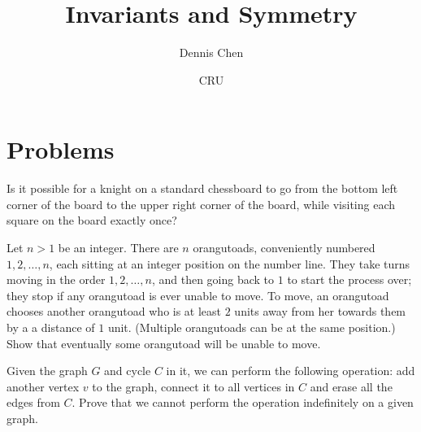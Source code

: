 \documentclass[mast]{lucky}
\title{Invariants and Symmetry}
\author{Dennis Chen}
\date{CRU}
\begin{document}
\maketitle



\pagebreak

\section{Problems}



\begin{prob}{2}
Is it possible for a knight on a standard chessboard to go from the bottom left corner of the board to the upper right corner of the board, while visiting each square on the board exactly once?
\end{prob}

\begin{prob}[USAMTS 2019]{2}
Let $n>1$ be an integer. There are $n$ orangutoads, conveniently numbered $1,2,\dots{},n$, each sitting at an integer position on the number line. They take turns moving in the order $1,2,\dots{},n$, and then going back to $1$ to start the process over; they stop if any orangutoad is ever unable to move. To move, an orangutoad chooses another orangutoad who is at least $2$ units away from her towards them by a a distance of $1$ unit. (Multiple orangutoads can be at the same position.) Show that eventually some orangutoad will be unable to move.
\end{prob}

\begin{req}[PUMaC 2020]{2}
Given the graph $G$ and cycle $C$ in it, we can perform the following operation: add another vertex $v$ to the graph, connect it to all vertices in $C$ and erase all the edges from $C.$ Prove that we cannot perform the operation indefinitely on a given graph.
\end{req}
\end{document}
